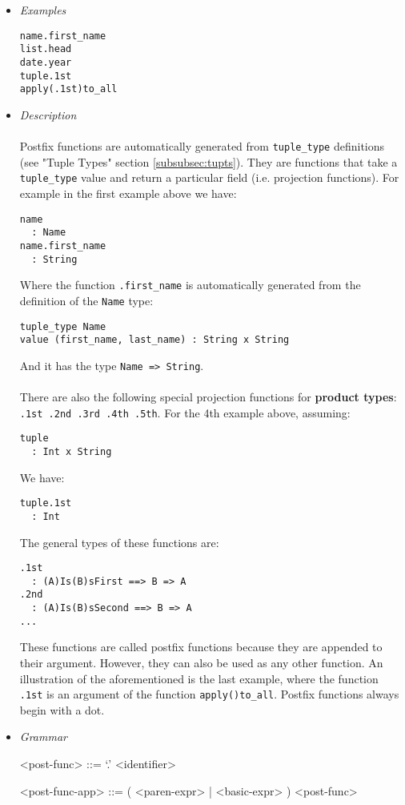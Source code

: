 \documentclass{article}
\begin{document}
\begin{itemize}

\item \textit{Examples}
\begin{verbatim}
name.first_name
list.head
date.year
tuple.1st
apply(.1st)to_all
\end{verbatim}

\item \textit{Description} \\\\
Postfix functions are automatically generated from \texttt{tuple_type}
definitions (see "Tuple Types" section \ref{subsubsec:tupts}). They are
functions that take a \texttt{tuple_type} value and return a particular field
(i.e. projection functions). For example in the first example above we have:
\begin{verbatim}
name 
  : Name
name.first_name
  : String
\end{verbatim}
Where the function \texttt{.first_name} is automatically generated from the
definition of the \texttt{Name} type:
\begin{verbatim}
tuple_type Name
value (first_name, last_name) : String x String
\end{verbatim}
And it has the type \texttt{Name => String}.
\\\\
There are also the following special projection functions for \textbf{product
types}: \texttt{.1st .2nd .3rd .4th .5th}. For the 4th example above, assuming:
\begin{verbatim}
tuple 
  : Int x String
\end{verbatim}
We have:
\begin{verbatim}
tuple.1st
  : Int
\end{verbatim}
The general types of these functions are:
\begin{verbatim}
.1st
  : (A)Is(B)sFirst ==> B => A
.2nd
  : (A)Is(B)sSecond ==> B => A
...
\end{verbatim}
These functions are called postfix functions because they are appended to
their argument. However, they can also be used as any other function.
An illustration of the aforementioned is the last example, where the function
\texttt{.1st} is an argument of the function \texttt{apply()to_all}.
Postfix functions always begin with a dot.


\item \textit{Grammar}
\begin{grammar}
<post-func> ::= `.' <identifier>

<post-func-app> ::= ( <paren-expr> | <basic-expr> ) <post-func>
\end{grammar}

\end{itemize}
\end{document}
